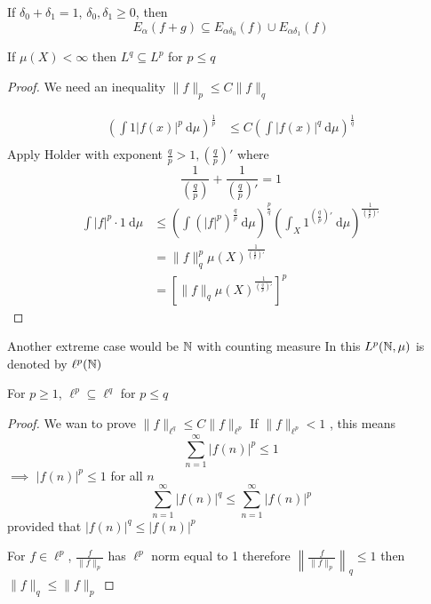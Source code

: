 \begin{claim}
  If $\delta_0 + \delta_1 = 1$, $\delta_0, \delta_1 \ge 0$, then
  \[E_\alpha(f + g) \subseteq E_{\alpha\delta_0}(f) \cup E_{\alpha\delta_1}(f)\]
\end{claim}

\begin{theorem}
  If $\mu(X) < \infty$ then $L^q \subseteq L^p$ for $p \le q$ 
\end{theorem}

\begin{proof}
  We need an inequality $\|f\|_p \le C \|f\|_q$

  \begin{align*}
    \left(\int 1 |f(x)|^p \ \mathrm{d}\mu\right)^{\frac1p} &\le C\left(\int |f(x)|^q \ \mathrm{d}\mu\right)^{\frac1q} \\
  \end{align*}
  Apply Holder with exponent $\frac{q}{p} > 1, \left(\frac{q}{p}\right)'$ where
  \[\frac1{\left(\frac qp\right)} + \frac1{\left(\frac qp\right)'} = 1\]
  \begin{align*}
    \int |f|^p \cdot 1\ \mathrm{d}\mu &\le \left(\int (|f|^p)^\frac{q}{p} \ \mathrm{d}\mu\right)^{\frac{p}{q}}\left(\int_X 1^{\left(\frac qp\right)'} \ \mathrm{d}\mu\right)^{\frac1{\left(\frac{q}p\right)'}} \\
    &= \|f\|_q^p\mu(X)^{\frac1{\left(\frac{q}p\right)'}} \\
    &= \left[\|f\|_q \mu(X)^{\frac1{\left(\frac{q}p\right)'}}\right]^p
  \end{align*}
\end{proof}

Another extreme case would be $\mathbb N$ with counting measure 
In this $L^p(\mathbb N, \mu)$ is denoted by $\ell^p(\mathbb N)$

\begin{theorem}
  For $p \ge 1$, $\ell^p \subseteq \ell^q$ for $p \le q$
\end{theorem}

\begin{proof}
  We wan to prove $\|f\|_{\ell^q} \le C\|f\|_{\ell^p}$
  If $\|f\|_{\ell^p} < 1$ , this means 
  \[\sum_{n=1}^\infty |f(n)|^p \le 1\]
  $\implies$ $|f(n)|^p \le 1$ for all $n$
  \[\sum_{n=1}^\infty |f(n)|^q \le \sum_{n=1}^\infty |f(n)|^p\]
  provided that $|f(n)|^q \le |f(n)|^p$

  For $f \in \ell^p$, $\frac{f}{\|f\|_p}$ has $\ell^p$ norm equal to 1
  therefore $\left\|\frac f{\|f\|_p}\right\|_q \le 1$ then $\|f\|_q \le \|f\|_p$
\end{proof}


